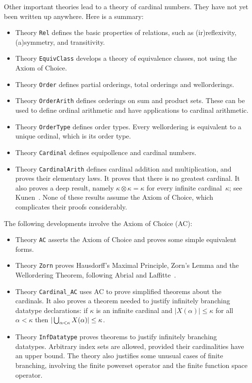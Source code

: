 Other important theories lead to a theory of cardinal numbers.  They have
not yet been written up anywhere.  Here is a summary:
\begin{itemize}
\item Theory {\tt Rel} defines the basic properties of relations, such as
  (ir)reflexivity, (a)symmetry, and transitivity.

\item Theory {\tt EquivClass} develops a theory of equivalence
  classes, not using the Axiom of Choice.

\item Theory {\tt Order} defines partial orderings, total orderings and
  wellorderings.

\item Theory {\tt OrderArith} defines orderings on sum and product sets.
  These can be used to define ordinal arithmetic and have applications to
  cardinal arithmetic.

\item Theory {\tt OrderType} defines order types.  Every wellordering is
  equivalent to a unique ordinal, which is its order type.

\item Theory {\tt Cardinal} defines equipollence and cardinal numbers.
 
\item Theory {\tt CardinalArith} defines cardinal addition and
  multiplication, and proves their elementary laws.  It proves that there
  is no greatest cardinal.  It also proves a deep result, namely
  $\kappa\otimes\kappa=\kappa$ for every infinite cardinal~$\kappa$; see
  Kunen~\cite[page 29]{kunen80}.  None of these results assume the Axiom of
  Choice, which complicates their proofs considerably.  
\end{itemize}

The following developments involve the Axiom of Choice (AC):
\begin{itemize}
\item Theory {\tt AC} asserts the Axiom of Choice and proves some simple
  equivalent forms.

\item Theory {\tt Zorn} proves Hausdorff's Maximal Principle, Zorn's Lemma
  and the Wellordering Theorem, following Abrial and
  Laffitte~\cite{abrial93}.

\item Theory \verb|Cardinal_AC| uses AC to prove simplified theorems about
  the cardinals.  It also proves a theorem needed to justify
  infinitely branching datatype declarations: if $\kappa$ is an infinite
  cardinal and $|X(\alpha)| \le \kappa$ for all $\alpha<\kappa$ then
  $|\bigcup\sb{\alpha<\kappa} X(\alpha)| \le \kappa$.

\item Theory {\tt InfDatatype} proves theorems to justify infinitely
  branching datatypes.  Arbitrary index sets are allowed, provided their
  cardinalities have an upper bound.  The theory also justifies some
  unusual cases of finite branching, involving the finite powerset operator
  and the finite function space operator.
\end{itemize}



